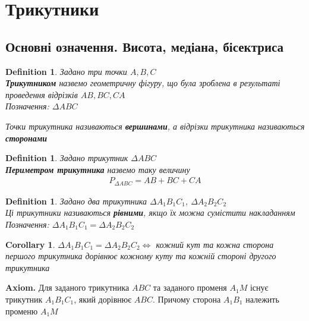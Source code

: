 \documentclass[a4paper, 14pt]{extarticle}
\theoremstyle{theoremdd}
\theoremstyle{theoremdd}
\newtheorem{definition}[theorem]{Definition}
\theoremstyle{theoremdd}
\theoremstyle{theoremdd}
\theoremstyle{theoremdd}
\theoremstyle{theoremdd}
\theoremstyle{theoremdd}
\theoremstyle{theoremdd}
\newtheorem{corollary}[theorem]{Corollary}
\begin{document}
\section{Трикутники}
\subsection{Основні означення. Висота, медіана, бісектриса}
\begin{definition}
Задано три точки $A,B,C$\\
\textbf{Трикутником} назвемо геометричну фігуру, що була зроблена в результаті проведення відрізків $AB,BC,CA$\\
Позначення: $\Delta ABC$
\begin{figure}[H]
\centering
{}
\end{figure}
Точки трикутника називаються \textbf{вершинами}, а відрізки трикутника називаються \textbf{сторонами}
\end{definition}

\begin{definition} Задано трикутник $\Delta ABC$\\
\textbf{Периметром трикутника} назвемо таку величину
\begin{align*}
P_{\Delta ABC} = AB + BC + CA
\end{align*}
\end{definition}

\begin{definition}
Задано два трикутника $\Delta A_1B_1C_1$, $\Delta A_2B_2C_2$\\
Ці трикутники називаються \textbf{рівними}, якщо їх можна сумістити накладанням\\
Позначення: $\Delta A_1B_1C_1 = \Delta A_2B_2C_2$
\end{definition}

\begin{corollary}
$\Delta A_1B_1C_1 = \Delta A_2B_2C_2 \iff$ кожний кут та кожна сторона першого трикутника дорівнює кожному куту та кожній стороні другого трикутника
\end{corollary}

\textbf{Axiom.} Для заданого трикутника $ABC$ та заданого променя $A_1M$ існує трикутник $A_1B_1C_1$, який дорівнює $ABC$. Причому сторона $A_1B_1$ належить променю $A_1M$
\end{document}

